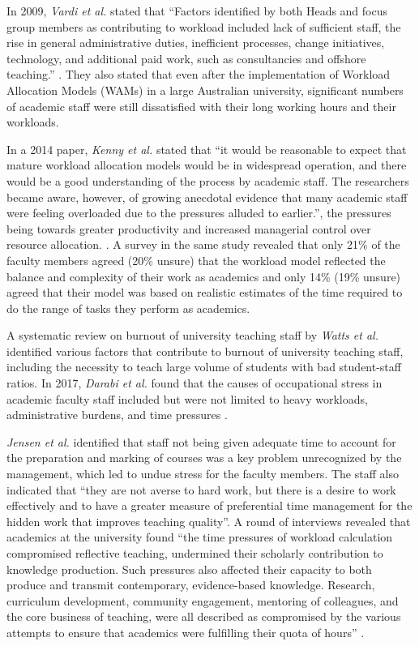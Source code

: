 In 2009, \textit{Vardi et al.} stated that ``Factors identified by both Heads and focus group members as contributing to workload included lack of sufficient staff, the rise in general administrative duties, inefficient processes, change initiatives, technology, and additional paid work, such as consultancies and offshore teaching.'' \cite{vardi2009impacts}. They also stated that even after the implementation of Workload Allocation Models (WAMs) in a large Australian university, significant numbers of academic staff were still dissatisfied with their long working hours and their workloads.

In a 2014 paper, \textit{Kenny et al.} stated that ``it would be reasonable to expect that mature workload allocation models would be in widespread operation, and there would be a good understanding of the process by academic staff. The researchers became aware, however, of growing anecdotal evidence that many academic staff were feeling overloaded due to the pressures alluded to earlier.'', the pressures being towards greater productivity and increased managerial control over resource allocation. \cite{kenny2014effectiveness}. A survey in the same study revealed that only 21\% of the faculty members agreed (20\% unsure) that the workload model reflected the balance and complexity of their work as academics and only 14\% (19\% unsure) agreed that their model was based on realistic estimates of the time required to do the range of tasks they perform as academics.

A systematic review on burnout of university teaching staff by \textit{Watts et al.} \cite{watts2011burnout} identified various factors that contribute to burnout of university teaching staff, including the necessity to teach large volume of students with bad student-staff ratios. In 2017, \textit{Darabi et al.} found that the causes of occupational stress in academic faculty staff included but were not limited to heavy workloads, administrative burdens, and time pressures \cite{darabi2017qualitative}.

\textit{Jensen et al.} identified that staff not being given adequate time to account for the preparation and marking of courses was a key problem unrecognized by the management, which led to undue stress for the faculty members. The staff also indicated that ``they are not averse to hard work, but there is a desire to work effectively and to have a greater measure of preferential time management for the hidden work that improves teaching quality''. A round of interviews revealed that academics at the university found ``the time pressures of workload calculation compromised reflective teaching, undermined their scholarly contribution to knowledge production. Such pressures also affected their capacity to both produce and transmit contemporary, evidence-based knowledge. Research, curriculum development, community engagement, mentoring of colleagues, and the core business of teaching, were all described as compromised by the various attempts to ensure that academics were fulfilling their quota of hours'' \cite{jensen2009vanishing}.

